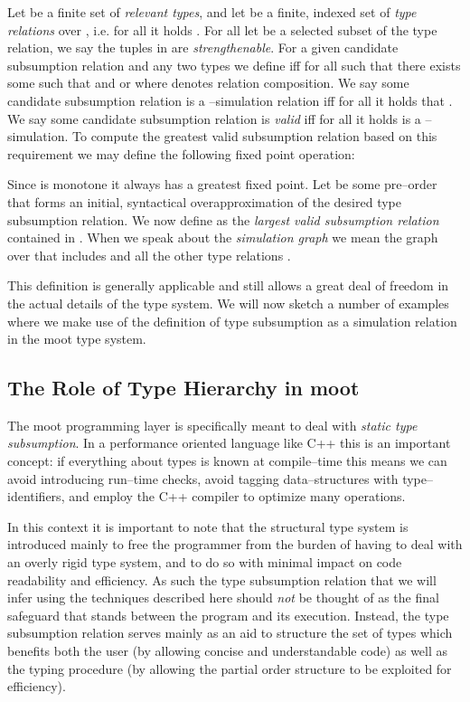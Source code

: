 \documentclass{sigplanconf}
\newcommand{\concept}[1]{\emph{#1}}
\begin{document}
\begin{definition}
Let  be a finite set of \concept{relevant
  types}, and let  be a finite,
indexed set of \concept{type relations} over , i.e. for all  it holds . For all  let  be a selected
subset of the type relation, we say the tuples in 
are \concept{strengthenable}.
For a given candidate subsumption relation  and any two types  we define  iff for all  such that  there exists some  such that 
and  or  where 
denotes relation composition.
We say some candidate subsumption relation  is a --simulation relation iff for all  it holds that .
We say some candidate subsumption relation  is \concept{valid} iff for all  it holds
 is a --simulation.
To compute the greatest valid subsumption relation based on this
requirement we may define the following fixed point operation:

Since  is monotone it always has a greatest fixed point. Let
 be some pre--order that forms an initial,
syntactical overapproximation of the desired type subsumption
relation. We now define  as the \emph{largest valid
  subsumption relation} contained in .
When we speak about the \concept{simulation graph} we mean the graph
over  that includes  and all the other type relations .
\end{definition}

This definition is generally applicable and still allows a great deal
of freedom in the actual details of the type system. We will now
sketch a number of examples where we make use of the definition of
type subsumption as a simulation relation in the {\sc moot} type
system.

\subsection{The Role of Type Hierarchy in {\sc moot}}

The {\sc moot} programming layer is specifically meant to deal with
\emph{static type subsumption}. In a performance oriented language
like C++ this is an important concept: if everything about types is
known at compile--time this means we can avoid introducing run--time
checks, avoid tagging data--structures with type--identifiers, and
employ the C++ compiler to optimize many operations.

In this context it is important to note that the structural type
system is introduced mainly to free the programmer from the burden of
having to deal with an overly rigid type system, and to do so with
minimal impact on code readability and efficiency.
As such the type subsumption relation that we will infer using the
techniques described here should \emph{not} be thought of as the final
safeguard that stands between the program and its execution.
Instead, the type subsumption relation serves mainly as an aid to
structure the set of types which benefits both the user (by allowing
concise and understandable code) as well as the typing procedure (by
allowing the partial order structure to be exploited for efficiency).
\end{document}
